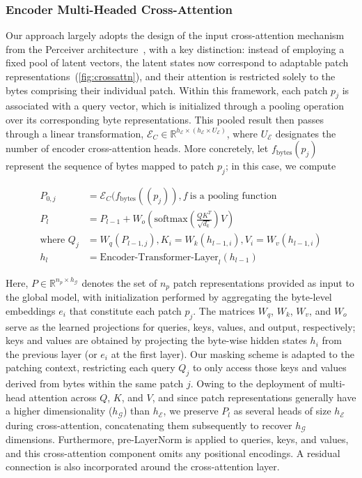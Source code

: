 \subsubsection{Encoder Multi-Headed Cross-Attention}
\label{sec:enc-cross-attn}
Our approach largely adopts the design of the input cross-attention mechanism from the Perceiver architecture~\citep{jaegle2021perceiver}, with a key distinction: instead of employing a fixed pool of latent vectors, the latent states now correspond to adaptable patch representations~(\autoref{fig:crossattn}), and their attention is restricted solely to the bytes comprising their individual patch. Within this framework, each patch $p_j$ is associated with a query vector, which is initialized through a pooling operation over its corresponding byte representations. This pooled result then passes through a linear transformation, $\mathcal{E}_{C} \in \mathbb{R}^{h_{\mathcal{E}} \times (h_{\mathcal{E}} \times U_{\mathcal{E}})}$, where $U_{\mathcal{E}}$ designates the number of encoder cross-attention heads. More concretely, let $f_{\text{bytes}}(p_j)$ represent the sequence of bytes mapped to patch $p_j$; in this case, we compute

\begin{align}
P_{0,j} &= \mathcal{E}_{C}(f_\text{bytes}((p_j)), f~ \text{is a pooling function} \\
P_l &= P_{l-1} + W_o\left(\text{softmax}\left(\frac{QK^T}{\sqrt{d_k}}\right)V\right) \\
\text{where } Q_j &= W_q(P_{l-1,j}), K_i = W_k(h_{l-1,i}), V_i = W_v(h_{l-1,i}) \\
h_l &= \text{Encoder-Transformer-Layer}_l(h_{l-1})
\end{align}

Here, $P \in \mathbb{R}^{n_p \times h_{\mathcal{G}}}$ denotes the set of $n_p$ patch representations provided as input to the global model, with initialization performed by aggregating the byte-level embeddings $e_i$ that constitute each patch $p_j$. The matrices $W_q$, $W_k$, $W_v$, and $W_o$ serve as the learned projections for queries, keys, values, and output, respectively; keys and values are obtained by projecting the byte-wise hidden states $h_i$ from the previous layer (or $e_i$ at the first layer). Our masking scheme is adapted to the patching context, restricting each query $Q_j$ to only access those keys and values derived from bytes within the same patch $j$. Owing to the deployment of multi-head attention across $Q$, $K$, and $V$, and since patch representations generally have a higher dimensionality ($h_{\mathcal{G}}$) than $h_{\mathcal{E}}$, we preserve $P_l$ as several heads of size $h_{\mathcal{E}}$ during cross-attention, concatenating them subsequently to recover $h_{\mathcal{G}}$ dimensions. Furthermore, pre-LayerNorm is applied to queries, keys, and values, and this cross-attention component omits any positional encodings. A residual connection is also incorporated around the cross-attention layer.

